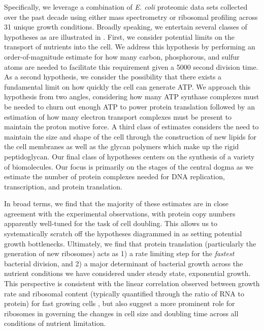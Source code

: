 Specifically, we leverage a combination of \textit{E. coli} proteomic data
sets collected over the past decade using either mass spectrometry
\citep{schmidt2016,peebo2015, valgepea2013} or ribosomal profiling
\citep{li2014} across 31 unique growth conditions. Broadly speaking, we
entertain several classes of hypotheses as are illustrated in
. First, we consider potential limits on the transport of
nutrients into the cell. We address this hypothesis by performing an
order-of-magnitude estimate for how many carbon, phosphorous, and sulfur
atoms are needed to facilitate this requirement given a 5000 second division
time. As a second hypothesis, we consider the possibility that there exists a
fundamental limit on how quickly the cell can generate ATP. We approach this
hypothesis from two angles, considering how many ATP synthase complexes must
be needed to churn out enough ATP to power protein translation followed by an
estimation of how many electron transport complexes must be present to
maintain the proton motive force. A third class of estimates considers the
need to maintain the size and shape of the cell through the construction of
new lipids for the cell membranes as well as the glycan polymers which make
up the rigid peptidoglycan. Our final class of hypotheses centers on the
synthesis of a variety of biomolecules. Our focus is primarily on the stages
of the central dogma as we estimate the number of protein complexes needed
for DNA replication, transcription, and protein translation.

In broad terms, we find that the majority of these estimates are in close
agreement with the experimental observations, with protein copy numbers
apparently well-tuned for the task of cell doubling. This allows us to
systematically scratch off the hypotheses diagrammed in  as
setting potential growth bottlenecks. Ultimately, we find that protein
translation (particularly the generation of new ribosomes) acts as 1) a rate
limiting step for the \textit{fastest} bacterial division, and 2) a major
determinant of bacterial growth across the nutrient conditions we have
considered under steady state, exponential growth. This perspective is
consistent with the linear correlation observed between growth rate and
ribosomal content (typically quantified through the ratio of RNA to protein) for
fast growing cells \citep{scott2010}, but also suggest a more prominent role for
ribosomes in governing the changes in cell size and doubling time across all
conditions of nutrient limitation.

